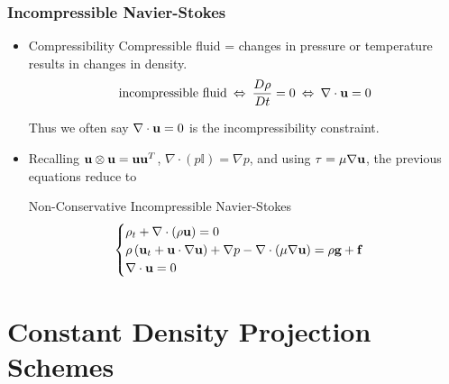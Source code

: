 \documentclass{beamer}
\begin{document}
\begin{frame}
  \frametitle{Incompressible Navier-Stokes}
  \begin{itemize}
    \item<1->
  \begin{block}{Compressibility}
    Compressible fluid = changes in pressure or temperature results in changes in density.
    \begin{equation*}
      \mbox{incompressible fluid} \: \Leftrightarrow \: \frac{D\rho}{Dt} = 0 \: \Leftrightarrow \: \nabla\cdot \textbf{u} = 0
    \end{equation*}
  \end{block}
  Thus we often say $\nabla\cdot\textbf{u}=0$ is the incompressibility constraint.
  \item<2-> Recalling $\textbf{u}\otimes\textbf{u} = \textbf{u}\textbf{u}^{T}$, $\nabla\cdot(p\mathbb{I}) = \nabla p$, and using $\tau = \mu\nabla\textbf{u}$, the previous equations reduce to
  \begin{block}{Non-Conservative Incompressible Navier-Stokes}
   \begin{equation*}
     \begin{cases}
       \rho_t + \nabla\cdot\left(\rho \textbf{u} \right) = 0 &\\
       \rho\left( \textbf{u}_t + \textbf{u}\cdot\nabla\textbf{u} \right) + \nabla p - \nabla\cdot\left( \mu\nabla\textbf{u} \right) = \rho\textbf{g} + \textbf{f} & \\
       \nabla\cdot \textbf{u} = 0 &
     \end{cases}
   \end{equation*}
  \end{block}
  \end{itemize}
\end{frame}


%
%
%
\section[Projection]{Constant Density Projection Schemes}
\end{document}
